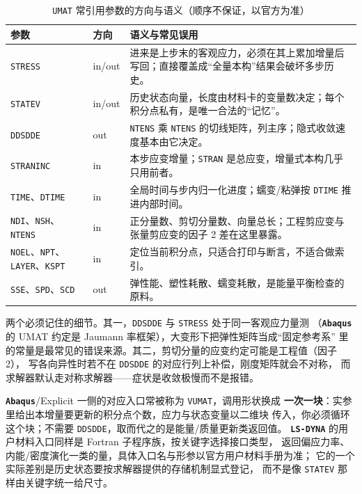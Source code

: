 \documentclass[12pt,a4paper,fontset=fandol]{ctexbook}
\newcommand{\Tp}[1]{\texttt{#1}}
\newcommand{\Lib}[1]{\textbf{\texttt{#1}}}
\begin{document}
\begin{table}[htbp]
\centering
\caption{\Tp{UMAT} 常引用参数的方向与语义（顺序不保证，以官方为准）}
\label{tab:ch05-umat-args}
\begin{tabular}{>{\raggedright\arraybackslash}p{}>{\raggedright\arraybackslash}p{}>{\raggedright\arraybackslash}p{}}
\toprule
参数 & 方向 & 语义与常见误用 \\
\midrule
\Tp{STRESS} & in/out & 进来是上步末的客观应力，必须在其上累加增量后写回；直接覆盖成``全量本构''结果会破坏多步历史。 \\
\Tp{STATEV} & in/out & 历史状态向量，长度由材料卡的变量数决定；每个积分点私有，是唯一合法的``记忆''。 \\
\Tp{DDSDDE} & out & \Tp{NTENS} 乘 \Tp{NTENS} 的切线矩阵，列主序；隐式收敛速度基本由它决定。 \\
\Tp{STRANINC} & in & 本步应变增量；\Tp{STRAN} 是总应变，增量式本构几乎只用前者。 \\
\Tp{TIME}、\Tp{DTIME} & in & 全局时间与步内归一化进度；蠕变/粘弹按 \Tp{DTIME} 推进内部时间。 \\
\Tp{NDI}、\Tp{NSH}、\Tp{NTENS} & in & 正分量数、剪切分量数、向量总长；工程剪应变与张量剪应变的因子 2 差在这里暴露。 \\
\Tp{NOEL}、\Tp{NPT}、\Tp{LAYER}、\Tp{KSPT} & in & 定位当前积分点，只适合打印与断言，不适合做索引。 \\
\Tp{SSE}、\Tp{SPD}、\Tp{SCD} & out & 弹性能、塑性耗散、蠕变耗散，是能量平衡检查的原料。 \\
\bottomrule
\end{tabular}
\end{table}

两个必须记住的细节。其一，\Tp{DDSDDE} 与 \Tp{STRESS} 处于同一客观应力量测
（\Lib{Abaqus} 的 UMAT 约定是 Jaumann 率框架），大变形下把弹性矩阵当成``固定参考系''
里的常量是最常见的错误来源。其二，剪切分量的应变约定可能是工程值（因子 2），
写各向异性时若不在 \Tp{DDSDDE} 的对应行列上补偿，刚度矩阵就会不对称，
而求解器默认走对称求解器——症状是收敛极慢而不是报错。

\Lib{Abaqus}/Explicit 一侧的对应入口常被称为 \Tp{VUMAT}，调用形状换成
\textbf{一次一块}：实参里给出本增量要更新的积分点个数，应力与状态变量以二维块
传入，你必须循环这个块；不需要 \Tp{DDSDDE}，取而代之的是能量/质量更新类返回值。
\Lib{LS-DYNA} 的用户材料入口同样是 Fortran 子程序族，按关键字选择接口类型，
返回偏应力率、内能/密度演化一类的量，具体入口名与形参以官方用户材料手册为准；
它的一个实际差别是历史状态要按求解器提供的存储机制显式登记，
而不是像 \Tp{STATEV} 那样由关键字统一给尺寸。
\end{document}
